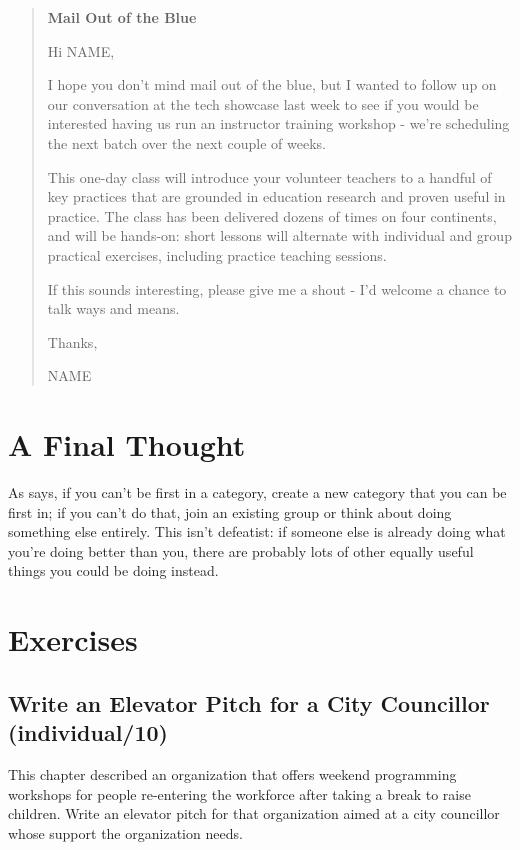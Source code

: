 \begin{quote}\setlength{\parindent}{0pt}
\textbf{Mail Out of the Blue}

Hi NAME,

I hope you don't mind mail out of the blue, but I wanted to follow up
on our conversation at the tech showcase last week to see if you would
be interested having us run an instructor training workshop - we're
scheduling the next batch over the next couple of weeks.

This one-day class will introduce your volunteer teachers to a handful
of key practices that are grounded in education research and proven
useful in practice. The class has been delivered dozens of times on
four continents, and will be hands-on: short lessons will alternate
with individual and group practical exercises, including practice
teaching sessions.

If this sounds interesting, please give me a shout - I'd welcome a
chance to talk ways and means.

Thanks,

NAME
\end{quote}

\section{A Final Thought}\label{s:marketing-final}

As \cite{Kuch2011} says, if you can't be first in a category, create
a new category that you can be first in; if you can't do that, join an
existing group or think about doing something else entirely. This isn't
defeatist: if someone else is already doing what you're doing better
than you, there are probably lots of other equally useful things you
could be doing instead.

\section{Exercises}\label{s:marketing-exercises}

\subsection{Write an Elevator Pitch for a City Councillor (individual/10)}\label{write-an-elevator-pitch-for-a-city-councillor-individual10}

This chapter described an organization that offers weekend programming
workshops for people re-entering the workforce after taking a break to
raise children. Write an elevator pitch for that organization aimed at a
city councillor whose support the organization needs.

